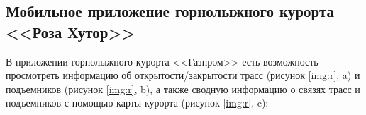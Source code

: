 \subsection{Мобильное приложение горнолыжного курорта <<Роза Хутор>>}

В приложении горнолыжного курорта <<Газпром>> есть возможность просмотреть информацию об открытости/закрытости трасс (рисунок \ref{img:r}, a) и подъемников (рисунок \ref{img:r}, b), а также сводную информацию о связях трасс и подъемников с помощью карты курорта (рисунок \ref{img:r}, c):



\begin{figure}[h!]
	\begin{center}
		
		\begin{subfigure}{.33\textwidth}
			\centering

\end{subfigure}
\end{center}
\end{figure}
